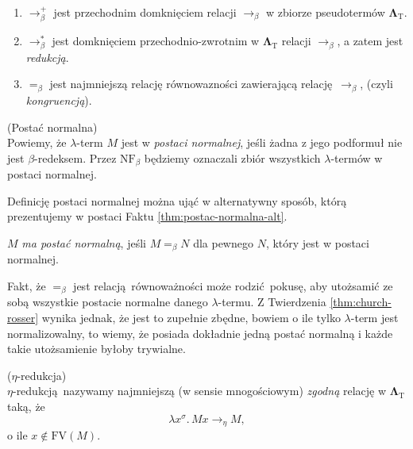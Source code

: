 \begin{enumerate}[label=B\arabic*.]
  \item \(\longrightarrow^{+}_{\beta}\) jest przechodnim domknięciem relacji \(\longrightarrow_{\beta}\) w zbiorze pseudotermów \(\mathbf{\Lambda}_{\mathrm{T}}\).

  \item \(\longrightarrow^{*}_{\beta}\) jest domknięciem przechodnio-zwrotnim w \(\mathbf{\Lambda}_{\mathrm{T}}\) relacji \(\longrightarrow_{\beta}\), a zatem jest \emph{redukcją}. 

  \item \(=_{\beta}\) jest najmniejszą relację równowazności zawierającą relację \(\longrightarrow_{\beta}\), (czyli \emph{kongruencją}).
\end{enumerate}

\begin{definicja}\label{def:postac-normalna}(Postać normalna)\\
  Powiemy, że \(\lambda\)-term \(M\) jest w \emph{postaci normalnej}, jeśli żadna z jego podformuł nie jest \(\beta\)-redeksem. Przez \(\mathrm{NF}_{\beta}\) będziemy oznaczali zbiór wszystkich \(\lambda\)-termów w postaci normalnej.
\end{definicja}    
Definicję postaci normalnej można ująć w alternatywny sposób, którą prezentujemy w postaci Faktu \ref{thm:postac-normalna-alt}.

\begin{fakt}\label{thm:postac-normalna-alt}
\(M\) \emph{ma postać normalną}, jeśli \(M=_{\beta}N\) dla pewnego \(N\), który jest w postaci normalnej.
\end{fakt}
\begin{uwaga*}
Fakt, że \(=_{\beta}\) jest relacją równoważności może rodzić pokusę, aby utożsamić  ze sobą wszystkie postacie normalne danego \(\lambda\)-termu. Z Twierdzenia \ref{thm:church-rosser} wynika jednak, że jest to zupełnie zbędne, bowiem o ile tylko \(\lambda\)-term jest normalizowalny, to wiemy, że posiada dokładnie jedną postać normalną i każde takie utożsamienie byłoby trywialne. 
\end{uwaga*}

  \begin{definicja}(\(\eta\)-redukcja)\\
\(\eta\)-redukcją nazywamy najmniejszą (w sensie mnogościowym) \emph{zgodną} relację w \(\mathbf{\Lambda}_{\mathrm{T}}\) taką, że
  \[
    \lambda x^\sigma.\, Mx\longrightarrow_{\eta} M,
  \]
    o ile \(x\not\in \mathrm{FV}(M)\).
  \end{definicja}

